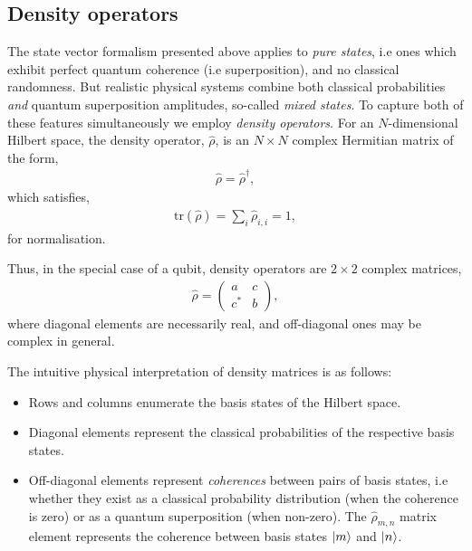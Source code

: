 %
%

\subsection{Density operators}

The state vector formalism presented above applies to \textit{pure states}, i.e ones which exhibit perfect quantum coherence (i.e superposition), and no classical randomness. But realistic physical systems combine both classical probabilities \textit{and} quantum superposition amplitudes, so-called \textit{mixed states}. To capture both of these features simultaneously we employ \textit{density operators}. For an $N$-dimensional Hilbert space, the density operator, $\hat\rho$, is an \mbox{$N\times N$} complex Hermitian matrix of the form,
\begin{align}
	\hat\rho = \hat\rho^\dag,
\end{align}
which satisfies,
\begin{align}
\mathrm{tr}(\hat\rho)=\sum_i \hat\rho_{i,i} = 1,	
\end{align}
for normalisation.

Thus, in the special case of a qubit, density operators are \mbox{$2\times 2$} complex matrices,
\begin{align}\label{eq:2x2density}
\hat\rho = \left(\begin{matrix}{}
  a & c \\
  c^* & b
\end{matrix}\right),
\end{align}
where diagonal elements are necessarily real, and off-diagonal ones may be complex in general.

The intuitive physical interpretation of density matrices is as follows:
\begin{itemize}
\item Rows and columns enumerate the basis states of the Hilbert space.
\item Diagonal elements represent the classical probabilities of the respective basis states.
\item Off-diagonal elements represent \textit{coherences} between pairs of basis states, i.e whether they exist as a classical probability distribution (when the coherence is zero) or as a quantum superposition (when non-zero). The $\hat\rho_{m,n}$ matrix element represents the coherence between basis states $|m\rangle$ and $|n\rangle$.
\end{itemize}

